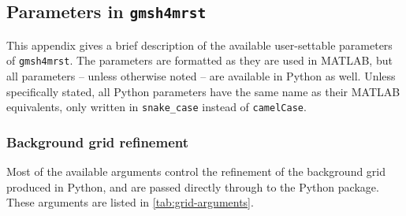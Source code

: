 \subsection{Parameters in \texttt{gmsh4mrst}}
\label{app:gmsh4mrst-arguments}

This appendix gives a brief description of the available user-settable parameters of \verb|gmsh4mrst|. The parameters are formatted as they are used in MATLAB, but all parameters -- unless otherwise noted -- are available in Python as well. Unless specifically stated, all Python parameters have the same name as their MATLAB equivalents, only written in \verb|snake_case| instead of \verb|camelCase|.

\subsubsection{Background grid refinement}
Most of the available arguments control the refinement of the background grid produced in Python, and are passed directly through to the Python package. These arguments are listed in \autoref{tab:grid-arguments}.

